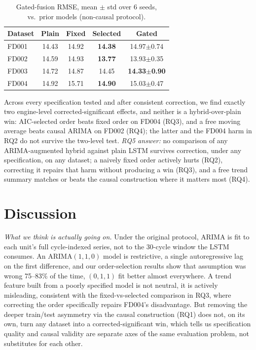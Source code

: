 \documentclass[conference]{IEEEtran}
\begin{document}
\begin{table}[t]
\centering
\caption{Gated-fusion RMSE, mean $\pm$ std over 6 seeds, vs.\ prior models (non-causal protocol).}
\label{tab:gated}
\footnotesize
\begin{tabular}{lcccc}
\toprule
Dataset & Plain & Fixed & Selected & Gated \\
\midrule
FD001 & 14.43 & 14.92 & \textbf{14.38} & 14.97{\tiny$\pm$0.74} \\
FD002 & 14.59 & 14.93 & \textbf{13.77} & 13.93{\tiny$\pm$0.35} \\
FD003 & 14.72 & 14.87 & 14.45 & \textbf{14.33{\tiny$\pm$0.90}} \\
FD004 & 14.92 & 15.71 & \textbf{14.90} & 15.03{\tiny$\pm$0.47} \\
\bottomrule
\end{tabular}
\end{table}

Across every specification tested and after consistent correction, we find exactly two engine-level corrected-significant effects, and neither is a hybrid-over-plain win: AIC-selected order beats fixed order on FD004 (RQ3), and a free moving average beats causal ARIMA on FD002 (RQ4); the latter and the FD004 harm in RQ2 do not survive the two-level test. \emph{RQ5 answer:} no comparison of any ARIMA-augmented hybrid against plain LSTM survives correction, under any specification, on any dataset; a naively fixed order actively hurts (RQ2), correcting it repairs that harm without producing a win (RQ3), and a free trend summary matches or beats the causal construction where it matters most (RQ4).

\section{Discussion}
\emph{What we think is actually going on.} Under the original protocol, ARIMA is fit to each unit's full cycle-indexed series, not to the 30-cycle window the LSTM consumes. An ARIMA$(1,1,0)$ model is restrictive, a single autoregressive lag on the first difference, and our order-selection results show that assumption was wrong 75--83\% of the time, $(0,1,1)$ fit better almost everywhere. A trend feature built from a poorly specified model is not neutral, it is actively misleading, consistent with the fixed-vs-selected comparison in RQ3, where correcting the order specifically repairs FD004's disadvantage. But removing the deeper train/test asymmetry via the causal construction (RQ1) does not, on its own, turn any dataset into a corrected-significant win, which tells us specification quality and causal validity are separate axes of the same evaluation problem, not substitutes for each other.
\end{document}
